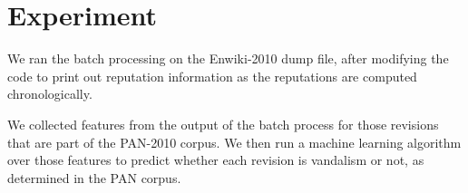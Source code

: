\section{Experiment}

We ran the batch processing on the Enwiki-2010 dump file,
after modifying the code to print out reputation information
as the reputations are computed chronologically.

We collected features from the output of the batch process
for those revisions that are part of the PAN-2010 corpus.
We then run a machine learning algorithm over those features
to predict whether each revision is vandalism or not, as determined
in the PAN corpus.

